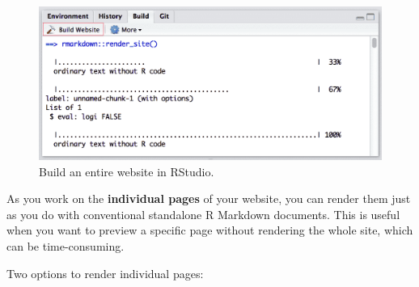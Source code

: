 \documentclass[
  a4paper,
  twoside,
  openright]{book}
\theoremstyle{definition}
\theoremstyle{definition}
\theoremstyle{definition}
\theoremstyle{definition}
\theoremstyle{remark}
\begin{document}
\begin{figure}
\includegraphics[width=16.72in]{images/site-build} \caption{Build an entire website in RStudio.}\label{fig:unnamed-chunk-2}
\end{figure}

As you work on the {\textbf{individual pages}} of your website, you can render them just as you do with conventional standalone R Markdown documents. This is useful when you want to preview a specific page without rendering the whole site, which can be time-consuming.

Two options to render individual pages:
\end{document}
